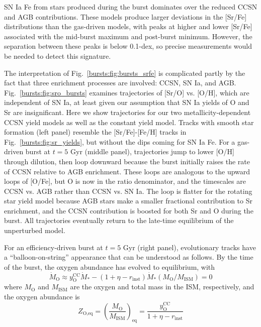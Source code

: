 SN Ia Fe from stars produced during the burst dominates over the reduced CCSN 
and AGB contributions. These models produce larger deviations in the [Sr/Fe] 
distributions than the gas-driven models, with peaks at higher and lower 
[Sr/Fe] associated with the mid-burst maximum and post-burst minimum. However, 
the separation between these peaks is below 0.1-dex, so precise measurements 
would be needed to detect this signature. 
\par 
The interpretation of Fig.~\ref{bursts:fig:bursts_srfe} is complicated partly by the 
fact that three enrichment processes are involved: CCSN, SN Ia, and AGB. 
Fig.~\ref{bursts:fig:sro_bursts} examines trajectories of [Sr/O] vs. [O/H], which are 
independent of SN Ia, at least given our assumption that SN Ia yields of O and 
Sr are insignificant. Here we show trajectories for our two 
metallicity-dependent CCSN yield models as well as the constant yield model. 
Tracks with smooth star formation (left panel) resemble the [Sr/Fe]-[Fe/H] 
tracks in Fig.~\ref{bursts:fig:sr_yields}, but without the dips coming for SN Ia Fe. 
For a gas-driven burst at $t = 5$ Gyr (middle panel), trajectories jump to 
lower [O/H] through dilution, then loop downward because the burst initially 
raises the rate of CCSN relative to AGB enrichment. These loops are analogous 
to the upward loops of [O/Fe], but O is now in the ratio denominator, and 
the timescales are CCSN vs. AGB rather than CCSN vs. SN Ia. The loop is flatter 
for the rotating star yield model because AGB stars make a smaller fractional 
contribution to Sr enrichment, and the CCSN contribution is boosted for both 
Sr and O during the burst. All trajectories eventually return to the late-time 
equilibrium of the unperturbed model. 
\par 
For an efficiency-driven burst at $t = 5$ Gyr (right panel), evolutionary 
tracks have a ``balloon-on-string'' appearance that can be understood as 
follows. By the time of the burst, the oxygen abundance has evolved to 
equilibrium, with 
\begin{equation} 
\label{bursts:eq:mdot_o_eq} 
\dot{M}_\text{O} \approx y_\text{O}^\text{CC}\dot{M}_* - 
(1 + \eta - r_\text{inst})\dot{M}_*(M_\text{O}/M_\text{ISM}) = 0 
\end{equation} 
where $M_\text{O}$ and $M_\text{ISM}$ are the oxygen and total mass in the ISM, 
respectively, and the oxygen abundance is 
\begin{equation} 
Z_\text{O,eq} = \left(\frac{M_\text{O}}{M_\text{ISM}}\right)_\text{eq} = 
\frac{y_\text{O}^\text{CC}}{1 + \eta - r_\text{inst}} 
\end{equation} 
